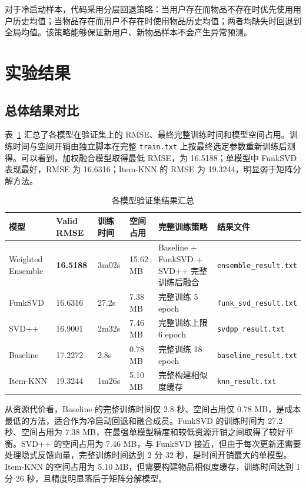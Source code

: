 \documentclass[UTF8,a4paper,10pt]{ctexart}
\begin{document}
对于冷启动样本，代码采用分层回退策略：当用户存在而物品不存在时优先使用用户历史均值；当物品存在而用户不存在时使用物品历史均值；两者均缺失时回退到全局均值。该策略能够保证新用户、新物品样本不会产生异常预测。

\section{实验结果}

\subsection{总体结果对比}

表~\ref{tab:model_results} 汇总了各模型在验证集上的 RMSE、最终完整训练时间和模型空间占用。训练时间与空间开销由独立脚本在完整 \texttt{train.txt} 上按最终选定参数重新训练后测得。可以看到，加权融合模型取得最低 RMSE，为 16.5188；单模型中 FunkSVD 表现最好，RMSE 为 16.6316；Item-KNN 的 RMSE 为 19.3244，明显弱于矩阵分解方法。

\begin{table}[H]
    \centering
    \caption{各模型验证集结果汇总}
    \label{tab:model_results}
    \small
    \renewcommand{\arraystretch}{1.2}
    \setlength{\tabcolsep}{2.5pt}
    \begin{tabular}{@{}p{}p{}p{}p{}p{}p{}@{}}
        \toprule
        \textbf{模型} & \textbf{Valid RMSE} & \textbf{训练时间} & \textbf{空间占用} & \textbf{完整训练策略} & \textbf{结果文件} \\
        \midrule
        Weighted Ensemble & \textbf{16.5188} & 3m02s & 15.62 MB & Baseline + FunkSVD + SVD++ 完整训练后融合 & \texttt{ensemble\_result.txt} \\
        FunkSVD & 16.6316 & 27.2s & 7.38 MB & 完整训练 5 epoch & \texttt{funk\_svd\_result.txt} \\
        SVD++ & 16.9001 & 2m32s & 7.46 MB & 完整训练上限 6 epoch & \texttt{svdpp\_result.txt} \\
        Baseline & 17.2272 & 2.8s & 0.78 MB & 完整训练 18 epoch & \texttt{baseline\_result.txt} \\
        Item-KNN & 19.3244 & 1m26s & 5.10 MB & 完整构建相似度缓存 & \texttt{knn\_result.txt} \\
        \bottomrule
    \end{tabular}
\end{table}

从资源代价看，Baseline 的完整训练时间仅 2.8 秒、空间占用仅 0.78 MB，是成本最低的方法，适合作为冷启动回退和融合成员。FunkSVD 的训练时间为 27.2 秒、空间占用为 7.38 MB，在最强单模型精度和较低资源开销之间取得了较好平衡。SVD++ 的空间占用为 7.46 MB，与 FunkSVD 接近，但由于每次更新还需要处理隐式反馈向量，完整训练时间达到 2 分 32 秒，是时间开销最大的单模型。Item-KNN 的空间占用为 5.10 MB，但需要构建物品相似度缓存，训练时间达到 1 分 26 秒，且精度明显落后于矩阵分解模型。
\end{document}
